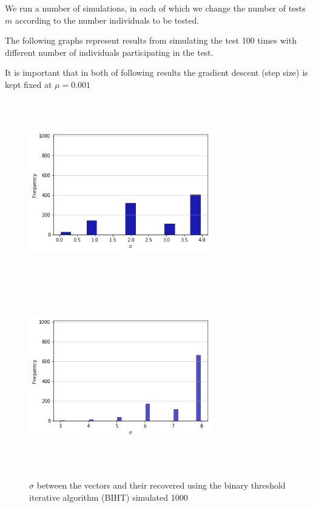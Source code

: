 We run a number of simulations, in each of which we change the number of tests $ m $ according to the number individuals to be tested. 

The following graphs represent results from simulating the test 100 times with different number of individuals participating in the test.  

It is important that in both of following results the gradient descent (step size)  is kept fixed at $ \mu = 0.001 $

 \begin{figure}[H]\label{sigma}
	\includegraphics[height=8cm, width=8cm]{images/sigma_biht}
	\includegraphics[height=8cm, width=8cm]{images/sigma_512}
	\caption{$ \sigma $ between the vectors and their recovered using the binary threshold iterative algorithm (BIHT) simulated 1000}
\end{figure}
